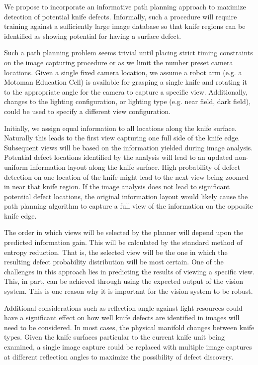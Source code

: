 \documentclass[letterpaper, 10 pt, conference]{ieeeconf}  %
\begin{document}
We propose to incorporate an informative path planning approach to maximize detection of potential knife defects. Informally, such a procedure will require training against a sufficiently large image database so that knife regions can be identified as showing potential for having a surface defect.

Such a path planning problem seems trivial until placing strict timing constraints on the image capturing procedure or as we limit the number preset camera locations. Given a single fixed camera location, we assume a robot arm (e.g. a Motoman Education Cell) is available for grasping a single knife and rotating it to the appropriate angle for the camera to capture a specific view. Additionally, changes to the lighting configuration, or lighting type (e.g. near field, dark field), could be used to specify a different view configuration.

Initially, we assign equal information to all locations along the knife surface. Naturally this leads to the first view capturing one full side of the knife edge. Subsequent views will be based on the information yielded during image analysis. Potential defect locations identified by the analysis will lead to an updated non-uniform information layout along the knife surface. High probability of defect detection on one location of the knife might lead to the next view being zoomed in near that knife region. If the image analysis does not lead to significant potential defect locations, the original information layout would likely cause the path planning algorithm to capture a full view of the information on the opposite knife edge.

The order in which views will be selected by the planner will depend upon the predicted information gain. This will be calculated by the standard method of entropy reduction. That is, the selected view will be the one in which the resulting defect probability distribution will be most certain. One of the challenges in this approach lies in predicting the results of viewing a specific view. This, in part, can be achieved through using the expected output of the vision system. This is one reason why it is important for the vision system to be robust.

Additional considerations such as reflection angle against light resources could have a significant effect on how well knife defects are identified in images will need to be considered. In most cases, the physical manifold changes between knife types. Given the knife surfaces particular to the current knife unit being examined, a single image capture could be replaced with multiple image captures at different reflection angles to maximize the possibility of defect discovery.
\end{document}
